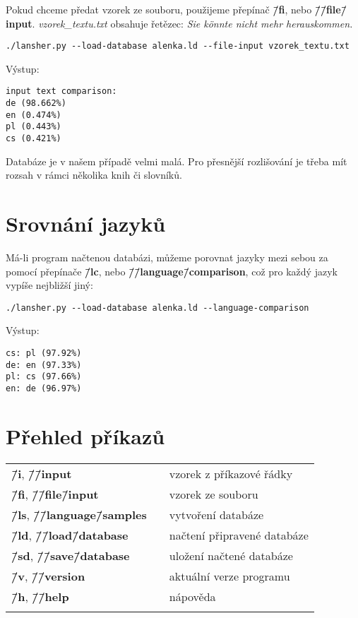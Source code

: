 \documentclass[11pt]{article}
\begin{document}
Pokud chceme předat vzorek ze souboru, použijeme přepínač \textbf{\=/fi}, nebo \textbf{\=/\=/file\=/input}. \textit{vzorek\_textu.txt} obsahuje řetězec: \textit{Sie könnte nicht mehr herauskommen.}
\begin{lstlisting}
./lansher.py --load-database alenka.ld --file-input vzorek_textu.txt
\end{lstlisting}

Výstup:
\begin{lstlisting}
input text comparison:
de (98.662%)
en (0.474%)
pl (0.443%)
cs (0.421%)
\end{lstlisting}

Databáze je v našem případě velmi malá. Pro přesnější rozlišování je třeba mít rozsah v rámci několika knih či slovníků.

\section{Srovnání jazyků}
Má-li program načtenou databázi, můžeme porovnat jazyky mezi sebou za pomocí přepínače \textbf{\=/lc}, nebo \textbf{\=/\=/language\=/comparison}, což pro každý jazyk vypíše nejbližší jiný:
\begin{lstlisting}
./lansher.py --load-database alenka.ld --language-comparison
\end{lstlisting}

Výstup:
\begin{lstlisting}
cs: pl (97.92%)
de: en (97.33%)
pl: cs (97.66%)
en: de (96.97%)
\end{lstlisting}

\section{Přehled příkazů}
\begin{center}
\begin{tabular}{ l l l }
 \textbf{\=/i}, \textbf{\=/\=/input} 				& & vzorek z příkazové řádky \\ 
 \textbf{\=/fi}, \textbf{\=/\=/file\=/input} 		& & vzorek ze souboru \\  
 \textbf{\=/ls}, \textbf{\=/\=/language\=/samples} 	& & vytvoření databáze \\
 \textbf{\=/ld}, \textbf{\=/\=/load\=/database} 	& & načtení připravené databáze \\
 \textbf{\=/sd}, \textbf{\=/\=/save\=/database} 	& & uložení načtené databáze \\
 \textbf{\=/v}, \textbf{\=/\=/version} 				& & aktuální verze programu \\
 \textbf{\=/h}, \textbf{\=/\=/help} 				& & nápověda \\
 & \hspace{100pt} &  \\
\end{tabular}
\end{center}
\end{document}
